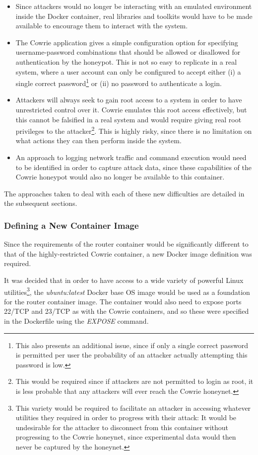 \begin{itemize}
\item Since attackers would no longer be interacting with an emulated environment inside the Docker container, real libraries and toolkits would have to be made available to encourage them to interact with the system.
\item The Cowrie application gives a simple configuration option for specifying username-password combinations that should be allowed or disallowed for authentication by the honeypot. This is not so easy to replicate in a real system, where a user account can only be configured to accept either (i) a single correct password\footnote{This also presents an additional issue, since if only a single correct password is permitted per user the probability of an attacker actually attempting this password is low.} or (ii) no password to authenticate a login. 
\item Attackers will always seek to gain root access to a system in order to have unrestricted control over it. Cowrie emulates this root access effectively, but this cannot be falsified in a real system and would require giving real root privileges to the attacker\footnote{This would be required since if attackers are not permitted to login as root, it is less probable that any attackers will ever reach the Cowrie honeynet.}. This is highly risky, since there is no limitation on what actions they can then perform inside the system.
\item An approach to logging network traffic and command execution would need to be identified in order to capture attack data, since these capabilities of the Cowrie honeypot would also no longer be available to this container.
\end{itemize} 

The approaches taken to deal with each of these new difficulties are detailed in the subsequent sections.

\subsubsection{Defining a New Container Image}
Since the requirements of the router container would be significantly different to that of the highly-restricted Cowrie container, a new Docker image definition was required. 

It was decided that in order to have access to a wide variety of powerful Linux utilities\footnote{This variety would be required to facilitate an attacker in accessing whatever utilities they required in order to progress with their attack: It would be undesirable for the attacker to disconnect from this container without progressing to the Cowrie honeynet, since experimental data would then never be captured by the honeynet.}, the \textit{ubuntu:latest} Docker base OS image would be used as a foundation for the router container image. The container would also need to expose ports 22/TCP and 23/TCP as with the Cowrie containers, and so these were specified in the Dockerfile using the \textit{EXPOSE} command.

